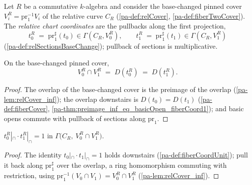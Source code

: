 \begin{definition}
  \label{pa-def:relFiberCoord}
  \leanok

  Let \(R\) be a commutative \(k\)-algebra and consider the base-changed pinned cover
  \(V_i^R = \mathrm{pr}_1^{-1} V_i\) of the relative curve \(C_R\)
  (\ref{pa-def:relCover}, \ref{pa-def:fiberTwoCover}). The \emph{relative chart coordinates}
  are the pullbacks along the first projection,
  \[
    t_0^R \;=\; \mathrm{pr}_1^{\sharp}(t_0) \in \Gamma(C_R, V_0^R), \qquad
    t_1^R \;=\; \mathrm{pr}_1^{\sharp}(t_1) \in \Gamma(C_R, V_1^R)
  \]
  (\ref{pa-def:relSectionsBaseChange}); pullback of sections is multiplicative.
\end{definition}

\begin{theorem}
  \label{pa-thm:relCover_inf_eq_basicOpen}
  \leanok

  On the base-changed pinned cover,
  \[
    V_0^R \cap V_1^R \;=\; D(t_0^R) \;=\; D(t_1^R).
  \]
\end{theorem}
\begin{proof}
  \leanok
  The overlap of the base-changed cover is the preimage of the overlap
  (\ref{pa-lem:relCover_inf}); the overlap downstairs is \(D(t_0) = D(t_1)\)
  (\ref{pa-def:fiberCover}, \ref{pa-thm:preimage_inf_eq_basicOpen_fiberCoord1}); and basic
  opens commute with pullback of sections along \(\mathrm{pr}_1\).
\end{proof}

\begin{theorem}
  \label{pa-thm:relFiberCoord_mul}
  \leanok

  \(t_0^R|_{\cap} \cdot t_1^R|_{\cap} = 1\) in
  \(\Gamma\bigl(C_R,\ V_0^R \cap V_1^R\bigr)\).
\end{theorem}
\begin{proof}
  \leanok
  The identity \(t_0|_{\cap} \cdot t_1|_{\cap} = 1\) holds downstairs
  (\ref{pa-def:fiberCoordUnit}); pull it back along \(\mathrm{pr}_1^{\sharp}\) over the
  overlap, a ring homomorphism commuting with restriction, using
  \(\mathrm{pr}_1^{-1}(V_0 \cap V_1) = V_0^R \cap V_1^R\) (\ref{pa-lem:relCover_inf}).
\end{proof}

